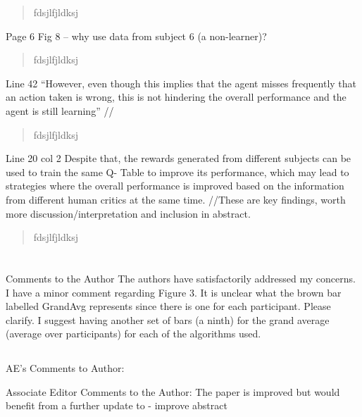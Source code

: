 \documentclass[journal,onecolumn,12pt]{IEEEtran}
\begin{document}
\begin{quotation}
{\color{blue}
fdsjlfjldksj
}
\end{quotation}

Page 6
Fig 8 – why use data from subject 6 (a non-learner)?

\begin{quotation}
{\color{blue}
fdsjlfjldksj
}
\end{quotation}

Line 42 “However, even though this implies that the agent misses frequently that an action taken is wrong, this is not hindering the overall performance and the agent is still learning” //

\begin{quotation}
{\color{blue}
fdsjlfjldksj
}
\end{quotation}

Line 20 col 2 Despite that, the rewards generated from different subjects can be used to train the same Q- Table to improve its performance, which may lead to strategies where the overall performance is improved based on the information from different human critics at the same time.
//These are key findings, worth more discussion/interpretation and inclusion in abstract.

\begin{quotation}
{\color{blue}
fdsjlfjldksj
}
\end{quotation}




\section*{}

Comments to the Author
The authors have satisfactorily addressed my concerns. I have a minor comment regarding Figure 3. It is unclear what the brown bar labelled GrandAvg represents since there is one for each participant. Please clarify. I suggest having another set of bars (a ninth) for the grand average (average over participants) for each of the algorithms used.


\subsection*{}
AE's Comments to Author:

Associate Editor
Comments to the Author:
The paper is improved but would benefit from a further update to
- improve abstract
\end{document}
